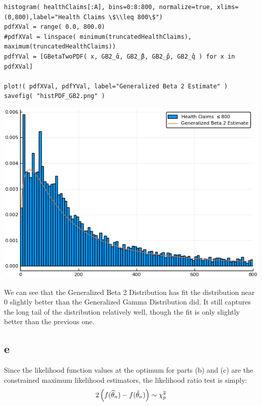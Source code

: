 \documentclass[12pt, letterpaper]{paper}
\begin{document}
\begin{verbatim}
histogram( healthClaims[:A], bins=0:8:800, normalize=true, xlims=(0,800),label="Health Claims \$\\leq 800\$")
pdfXVal = range( 0.0, 800.0)
#pdfXVal = linspace( minimum(truncatedHealthClaims), maximum(truncatedHealthClaims))
pdfYVal = [GBetaTwoPDF( x, GB2_̂α, GB2_̂β, GB2_̂p, GB2_̂q ) for x in pdfXVal]

plot!( pdfXVal, pdfYVal, label="Generalized Beta 2 Estimate" )
savefig( "histPDF_GB2.png" )
\end{verbatim}

\begin{center}
\includegraphics[width=.9\linewidth]{histPDF_GB2.png}
\end{center}

We can see that the Generalized Beta 2 Distribution has fit the
distribution near \(0\) slightly better than the Generalized Gamma
Distribution did. It still captures the long tail of the distribution
relatively well, though the fit is only slightly better than the
previous one. 

\subsection{e}
\label{sec:org65bd701}
Since the likelihood function values at the optimum for parts (b) and
(c) are the constrained maximum likelihood estimators, the likelihood
ratio test is simply: 
\begin{equation*}
  2 \left( f( \widehat{ \theta }_{n}) - f(\tilde{ \theta }_{n}) \right) \sim \chi_{p}^{2}
\end{equation*}
\end{document}
